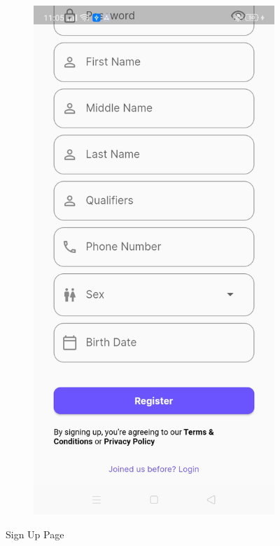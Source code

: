 \begin{figure}[!h]
\begin{subfigure}[c]{0.30\linewidth}
    \end{subfigure}
    \centering
    \begin{subfigure}[c]{0.30\linewidth}
        \centering
        \includegraphics[scale=0.15]{figures/Chapter4/Main/SignUp-2.jpg}
    \end{subfigure}
    \caption{Sign Up Page}
    \label{fig:userRegister}
\end{figure}

